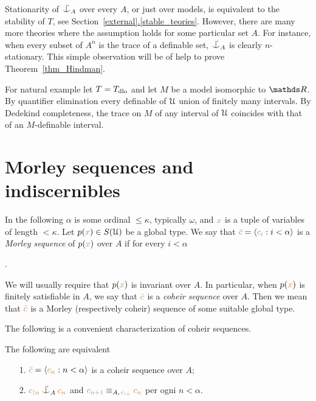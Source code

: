 \documentclass[creche.tex]{subfiles}
\begin{document}
\begin{example}\label{ex_coheir_stationary}
Stationarity of $\nonforkc_A$ over every $A$, or just over models, is equivalent to the stability of $T$, see Section~\hyperref[stable_teories]{\ref*{external}.\ref*{stable_teories}}.
However, there are many more theories where the assumption holds for some particular set $A$.
For instance, when every subset of $A^n$ is the trace of a definable set, $\nonforkc_A$ is clearly $n$-stationary.
This simple observation will be of help to prove Theorem~\ref{thm_Hindman}.

For natural example let $T=T_{\rm dlo}$ and let $M$ be a model isomorphic to $\RR$.
By quantifier elimination every definable of $\EuScript U$ union of finitely many intervals.
By Dedekind completeness, the trace on $M$ of any interval of $\EuScript U$ coincides with that of an $M$-definable interval.
\end{example}

\section{Morley sequences and indiscernibles}


In the following $\alpha$ is some ordinal $\le\kappa$, typically $\omega$, and ${\color{brown} x}$ is a tuple of variables of length $<\kappa$.
Let \mbox{$p({\color{brown} x})\in S(\EuScript U)$} be a global type.
We say that ${\color{brown}\bar c}=\langle{\color{brown}c_i}:i<\alpha\rangle$ is a \emph{Morley sequence\/} of $p({\color{brown} x})$ over $A$ if for every $i<\alpha$

.

We will usually require that $p({\color{brown} x})$ is invariant over $A$.
In particular, when $p({\color{brown} x})$ is finitely satisfiable in $A$, we say that ${\color{brown}\bar c}$ is a \emph{coheir sequence\/} over $A$.%
Then we mean that ${\color{brown}\bar c}$ is a Morley (respectively coheir) sequence of some suitable global type.

The following is a convenient characterization of coheir sequences.

\begin{lemma}\label{lem_coheir_property}
The following are equivalent
\begin{itemize}
\item[1.] ${\color{brown}\bar c}=\langle{\color{brown}c_n}:n<\alpha\rangle$ is a coheir sequence over $A$;
\item[2.] ${\mr c_{\restriction n}}\nonforkc_A{\mr c_n}$ and ${\color{brown} c_{n+1}}\equiv_{A,\,{\color{brown} c_{\restriction n}}}{\color{brown} c_n}$ per ogni $n<\alpha$.
\end{itemize}
\end{lemma}
\end{document}
